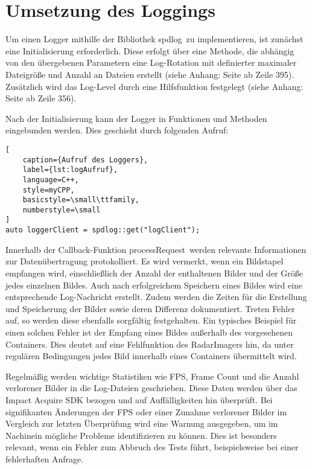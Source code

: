 \section{Umsetzung des Loggings} \label{Logging}

Um einen Logger mithilfe der Bibliothek \glqq spdlog\grqq\ zu implementieren, ist zunächst eine Initialisierung erforderlich. Diese erfolgt über eine Methode, die abhängig von 
den übergebenen Parametern eine Log-Rotation mit definierter maximaler Dateigröße und Anzahl an Dateien erstellt (siehe Anhang: Seite \pageref{initializeLogger} ab Zeile 395). 
Zusätzlich wird das Log-Level durch eine Hilfsfunktion festgelegt (siehe Anhang: Seite \pageref{setLogLevel} ab Zeile 356).

Nach der Initialisierung kann der Logger in Funktionen und Methoden eingebunden werden. Dies geschieht durch folgenden Aufruf:

\vspace{12pt}

\begin{lstlisting}[
    caption={Aufruf des Loggers},
    label={lst:logAufruf},
    language=C++,
    style=myCPP,
    basicstyle=\small\ttfamily,
    numberstyle=\small
]
auto loggerClient = spdlog::get("logClient");
\end{lstlisting}

Innerhalb der Callback-Funktion \glqq processRequest\grqq\ werden relevante Informationen zur Datenübertragung protokolliert. Es wird vermerkt, wenn ein Bildstapel empfangen wird, 
einschließlich der Anzahl der enthaltenen Bilder und der Größe jedes einzelnen Bildes. Auch nach erfolgreichem Speichern eines Bildes wird eine entsprechende Log-Nachricht erstellt. 
Zudem werden die Zeiten für die Erstellung und Speicherung der Bilder sowie deren Differenz dokumentiert. Treten Fehler auf, so werden diese ebenfalls sorgfältig festgehalten. Ein 
typisches Beispiel für einen solchen Fehler ist der Empfang eines Bildes außerhalb des vorgesehenen Containers. Dies deutet auf eine Fehlfunktion des RadarImagers hin, da unter 
regulären Bedingungen jedes Bild innerhalb eines Containers übermittelt wird.

Regelmäßig werden wichtige Statistiken wie \ac{FPS}, Frame Count und die Anzahl verlorener Bilder in die Log-Dateien geschrieben. Diese Daten werden über das Impact 
Acquire \acs{SDK} bezogen und auf Auffälligkeiten hin überprüft. Bei signifikanten Änderungen der \ac{FPS} oder einer Zunahme verlorener Bilder im Vergleich zur letzten Überprüfung 
wird eine Warnung ausgegeben, um im Nachinein mögliche Probleme identifizieren zu können. Dies ist besonders relevant, wenn ein Fehler zum Abbruch des Tests führt, beispielsweise 
bei einer fehlerhaften Anfrage.

